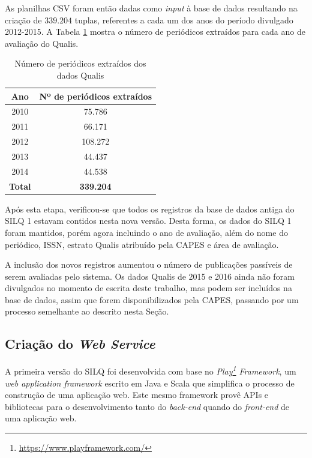 \documentclass[12pt]{article}
\begin{document}
As planilhas CSV foram então dadas como \textit{input} à base de dados resultando na criação de $339.204$ tuplas, referentes a cada um dos anos do período divulgado 2012-2015. A Tabela \ref{tab:n-registros-extraidos} mostra o número de periódicos extraídos para cada ano de avaliação do Qualis.

\begin{table}[!h]
\begin{center}
\caption{Número de periódicos extraídos dos dados Qualis}\label{tab:n-registros-extraidos}
\begin{tabular}{ c | c }
\hline
\textbf{Ano} & \textbf{Nº de periódicos extraídos} \\ \hline
2010 & 75.786 \\ \hline
2011 & 66.171 \\ \hline
2012 & 108.272 \\ \hline
2013 & 44.437 \\ \hline
2014 & 44.538 \\ \hline
\textbf{Total} & \textbf{339.204} \\ \hline
\end{tabular}
\end{center}
\end{table}

Após esta etapa, verificou-se que todos os registros da base de dados antiga do SILQ 1 estavam contidos nesta nova versão. Desta forma, os dados do SILQ 1 foram mantidos, porém agora incluindo o ano de avaliação, além do nome do periódico, ISSN, estrato Qualis atribuído pela CAPES e área de avaliação.

A inclusão dos novos registros aumentou o número de publicações passíveis de serem avaliadas pelo sistema. Os dados Qualis de 2015 e 2016 ainda não foram divulgados no momento de escrita deste trabalho, mas podem ser incluídos na base de dados, assim que forem disponibilizados pela CAPES, passando por um processo semelhante ao descrito nesta Seção.

\subsection{Criação do \textit{Web Service}} \label{sec:arquitetura-silq-2}

A primeira versão do SILQ foi desenvolvida com base no \textit{Play\footnote{\url{https://www.playframework.com/}
} Framework}, um \textit{web application framework} escrito em Java e Scala que simplifica o processo de construção de uma aplicação web. Este mesmo framework provê APIs e bibliotecas para o desenvolvimento tanto do \textit{back-end} quando do \textit{front-end} de uma aplicação web.
\end{document}
